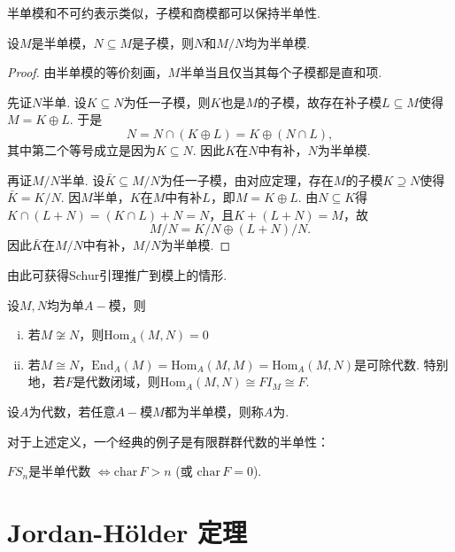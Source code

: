 半单模和不可约表示类似，子模和商模都可以保持半单性.
\begin{lemma}
    设$M$是半单模，$N \subseteq M$是子模，则$N$和$M/N$均为半单模.
\end{lemma}
\begin{proof}
    由半单模的等价刻画，$M$半单当且仅当其每个子模都是直和项.

    先证$N$半单. 设$K \subseteq N$为任一子模，则$K$也是$M$的子模，故存在补子模$L \subseteq M$使得$M = K \oplus L$. 于是
    \[N = N \cap (K \oplus L) = K \oplus (N \cap L),\]
    其中第二个等号成立是因为$K \subseteq N$. 因此$K$在$N$中有补，$N$为半单模.\par
    再证$M/N$半单. 设$\bar{K} \subseteq M/N$为任一子模，由对应定理，存在$M$的子模$K \supseteq N$使得$\bar{K} = K/N$. 因$M$半单，$K$在$M$中有补$L$，即$M = K \oplus L$. 由$N \subseteq K$得$K \cap (L + N) = (K \cap L) + N = N$，且$K + (L + N) = M$，故
    \[M/N = K/N \oplus (L + N)/N.\]
    因此$\bar{K}$在$M/N$中有补，$M/N$为半单模.
\end{proof}

由此可获得Schur引理推广到模上的情形.

\begin{lemma}[Schur引理]
    设$M, N$均为单$A-\!\!$模，则
    \begin{enumerate}[(i)]
        \item 若$M \not\cong N$，则$\mathrm{Hom}_A(M, N) = 0$
        \item 若$M \cong N$，$\mathrm{End}_A(M) = \mathrm{Hom}_A(M, M) = \mathrm{Hom}_A(M, N)$是可除代数.
        特别地，若$F$是代数闭域，则$\mathrm{Hom}_A(M, N) \cong F I_M \cong F$.
    \end{enumerate}
\end{lemma}

\begin{definition}[半单代数]
    设$A$为代数，若任意$A-\!\!$模$M$都为半单模，则称$A$为.
\end{definition}

对于上述定义，一个经典的例子是有限群群代数的半单性：

\begin{instance}
    $F S_n$是半单代数 $\Leftrightarrow \mathrm{char}\, F > n$ (或 $\mathrm{char}\, F = 0$).
\end{instance}

\section{Jordan-Hölder 定理}

